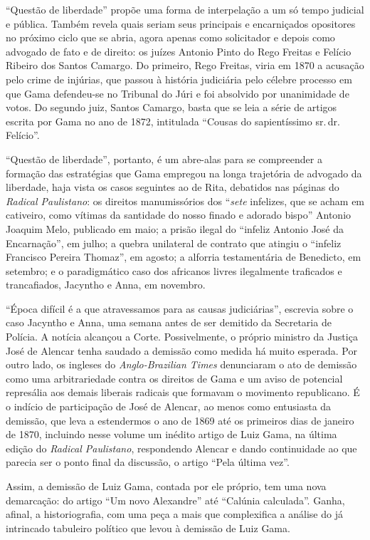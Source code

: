 ``Questão de liberdade'' propõe uma forma de interpelação a um só
tempo judicial e pública. Também revela quais seriam seus principais e
encarniçados opositores no próximo ciclo que se abria, agora apenas como
solicitador e depois como advogado de fato e de direito: os juízes
Antonio Pinto do Rego Freitas e Felício Ribeiro dos Santos Camargo. Do
primeiro, Rego Freitas, viria em 1870 a acusação pelo crime de injúrias,
que passou à história judiciária pelo célebre processo em que Gama
defendeu-se no Tribunal do Júri e foi absolvido por unanimidade de
votos. Do segundo juiz, Santos Camargo, basta que se leia a série de
artigos escrita por Gama no ano de 1872, intitulada ``Cousas do
sapientíssimo sr.\,dr.\,Felício''.

``Questão de liberdade'', portanto, é um abre-alas para se
compreender a formação das estratégias que Gama empregou na longa
trajetória de advogado da liberdade, haja vista os casos seguintes ao de
Rita, debatidos nas páginas do \emph{Radical Paulistano}: os direitos
manumissórios dos ``\emph{sete} infelizes, que se acham em cativeiro,
como vítimas da santidade do nosso finado e adorado bispo'' Antonio
Joaquim Melo, publicado em maio; a prisão ilegal do ``infeliz Antonio %
José da Encarnação'', em julho; a quebra unilateral de contrato que
atingiu o ``infeliz Francisco Pereira Thomaz'', em agosto; a alforria
testamentária de Benedicto, em setembro; e o paradigmático caso dos
africanos livres ilegalmente traficados e trancafiados, Jacyntho e Anna,
em novembro.

``Época difícil é a que atravessamos para as causas judiciárias'',
escrevia sobre o caso Jacyntho e Anna, uma semana antes de ser demitido
da Secretaria de Polícia. A notícia alcançou a Corte. Possivelmente, o
próprio ministro da Justiça José de Alencar tenha saudado a demissão
como medida há muito esperada. Por outro lado, os ingleses do
\emph{Anglo-Brazilian Times} denunciaram o ato de demissão como uma
arbitrariedade contra os direitos de Gama e um aviso de potencial
represália aos demais liberais radicais que formavam o movimento
republicano. É o indício de participação de José de Alencar, ao menos
como entusiasta da demissão, que leva a estendermos o ano de 1869 até os
primeiros dias de janeiro de 1870, incluindo nesse volume um inédito
artigo de Luiz Gama, na última edição do \emph{Radical Paulistano},
respondendo Alencar e dando continuidade ao que parecia ser o ponto
final da discussão, o artigo ``Pela última vez''.

Assim, a demissão de Luiz Gama, contada por ele próprio, tem uma nova
demarcação: do artigo ``Um novo Alexandre'' até ``Calúnia
calculada''. Ganha, afinal, a historiografia, com uma peça a mais que
complexifica a análise do já intrincado tabuleiro político que levou à
demissão de Luiz Gama.


